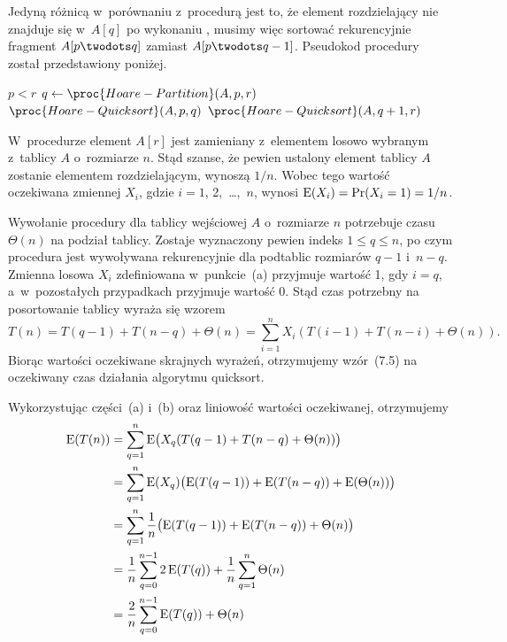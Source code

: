 \subproblem %
Jedyną różnicą w~porównaniu z~procedurą  jest to, że element rozdzielający nie znajduje się w~$A[q]$ po wykonaniu , musimy więc sortować rekurencyjnie fragment $A[p\twodots q]$ zamiast $A[p\twodots q-1]$. Pseudokod procedury został przedstawiony poniżej.
\begin{codebox}
\li	\If $p<r$
\li		\Then
			$q\gets\proc{Hoare-Partition}(A,p,r)$
\li			$\proc{Hoare-Quicksort}(A,p,q)$
\li			$\proc{Hoare-Quicksort}(A,q+1,r)$
		\End
\end{codebox}


\subproblem %
W~procedurze  element $A[r]$ jest zamieniany z~elementem losowo wybranym z~tablicy $A$ o~rozmiarze $n$. Stąd szanse, że pewien ustalony element tablicy $A$ zostanie elementem rozdzielającym, wynoszą $1/n$. Wobec tego wartość oczekiwana zmiennej $X_i$, gdzie $i=1$, 2,~\dots,~$n$, wynosi $\operatorname{E}(X_i)=\Pr(X_i=1)=1/n$.

\subproblem %
Wywołanie procedury  dla tablicy wejściowej $A$ o~rozmiarze $n$ potrzebuje czasu $\Theta(n)$ na podział tablicy. Zostaje wyznaczony pewien indeks $1\le q\le n$, po czym procedura jest wywoływana rekurencyjnie dla podtablic rozmiarów $q-1$ i~$n-q$. Zmienna losowa $X_i$ zdefiniowana w~punkcie~(a) przyjmuje wartość 1, gdy $i=q$, a~w~pozostałych przypadkach przyjmuje wartość 0. Stąd czas potrzebny na posortowanie  tablicy wyraża się wzorem
\[
	T(n) = T(q-1)+T(n-q)+\Theta(n) = \sum_{i=1}^nX_i(T(i-1)+T(n-i)+\Theta(n)).
\]
Biorąc wartości oczekiwane skrajnych wyrażeń, otrzymujemy wzór~(7.5) na oczekiwany czas działania algorytmu quicksort.

\subproblem %
Wykorzystując części~(a) i~(b) oraz liniowość wartości oczekiwanej, otrzymujemy
\begin{align*}
	\operatorname{E}(T(n)) &= \sum_{q=1}^n\operatorname{E}\bigl(X_q(T(q-1)+T(n-q)+\Theta(n))\bigr) \\
	&= \sum_{q=1}^n\operatorname{E}(X_q)\bigl(\operatorname{E}(T(q-1))+\operatorname{E}(T(n-q))+\operatorname{E}(\Theta(n))\bigr) \\
	&= \sum_{q=1}^n\frac{1}{n}\bigl(\operatorname{E}(T(q-1))+\operatorname{E}(T(n-q))+\Theta(n)\bigr) \\
	&= \frac{1}{n}\sum_{q=0}^{n-1}2\operatorname{E}(T(q))+\frac{1}{n}\sum_{q=1}^n\Theta(n) \\
	&= \frac{2}{n}\sum_{q=0}^{n-1}\operatorname{E}(T(q))+\Theta(n)
\end{align*}

